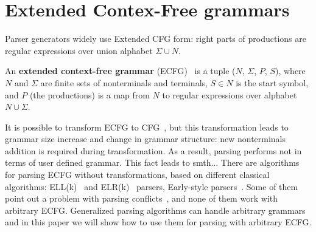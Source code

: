 \documentclass[runningheads,a4paper]{llncs}
\begin{document}



\section{Extended Contex-Free grammars}%



Parser generators widely use Extended CFG form: right parts of productions are regular 
expressions over union alphabet $\Sigma \cup N$. 
\begin{mydef}
An \textbf{extended context-free grammar} (ECFG)~\cite{ECFG} is a tuple ($N$, $\Sigma$, $P$, $S$), where $N$
and $\Sigma$ are finite sets of nonterminals and terminals, $ S\in N$ is the start symbol,
and $P$ (the productions) is a map from $N$ to regular expressions over alphabet $N \cup \Sigma$.
\end{mydef}

It is possible to transform ECFG to CFG~\cite{ELL}, but this transformation leads to grammar size 
increase and change in grammar structure: new nonterminals addition is required during transformation.
As a result, parsing performs not in terms of user defined grammar.
This fact leads to smth... 
There are algorithms for parsing ECFG without transformations, based on different classical algorithms: 
ELL(k)~\cite{!!!} and ELR(k)~\cite{!!!} parsers, Early-style parsers~\cite{!!!}.
Some of them point out a problem with parsing conflicts~\cite{}, and none of them work with arbitrary ECFG.
Generalized parsing algorithms can handle arbitrary grammars and in this paper we
will show how to use them for parsing with arbitrary ECFG.
\end{document}

